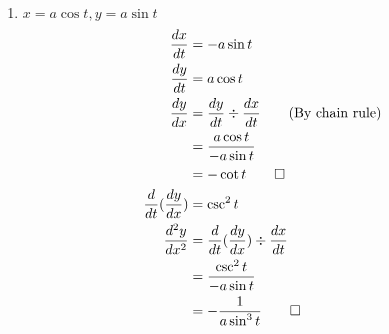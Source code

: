 \documentclass[12pt, a4paper]{article}
\begin{document}
\begin{enumerate}[Q\arabic*.]
\begin{enumerate}[(\alph*)]
      \item $\displaystyle x=a\cos t, y=a \sin t$
        \begin{align*}
          \frac{dx}{dt} &= -a\sin t\\
          \frac{dy}{dt} &= a\cos t\\
          \frac{dy}{dx} &= \frac{dy}{dt} \div \frac{dx}{dt} \tag*{\text{(By chain rule)}} \\
                        &= \frac{a\cos t}{-a\sin t} \\
                        &= -\cot t \qed\\
          \frac{d}{dt}(\frac{dy}{dx}) &= \csc^2 t\\
          \frac{d^2y}{dx^2} &= \frac{d}{dt}(\frac{dy}{dx}) \div \frac{dx}{dt} \\
                            &= \frac{\csc^2 t}{-a\sin t}\\
                            &= -\frac{1}{a\sin^3 t} \qed
        \end{align*}
    \end{enumerate}
\end{enumerate}
\end{document}
